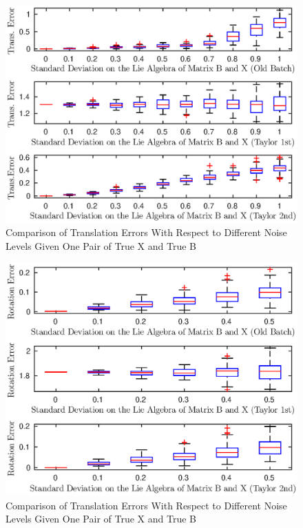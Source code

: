 \documentclass[twocolumn,10pt]{asme2ej}
\begin{document}
\begin{figure}[h]
\includegraphics[scale=0.6]{col_mean_trans_error_1_10.eps}
\caption{Comparison of Translation Errors With Respect to Different Noise Levels Given One Pair of True X and True B}
\centering
\label{tXB}
\end{figure}

\begin{figure}[h]
\includegraphics[scale=0.6]{col_mean_rot_error_1_6.eps}
\caption{Comparison of Translation Errors With Respect to Different Noise Levels Given One Pair of True X and True B}
\centering
\end{figure}
\end{document}
